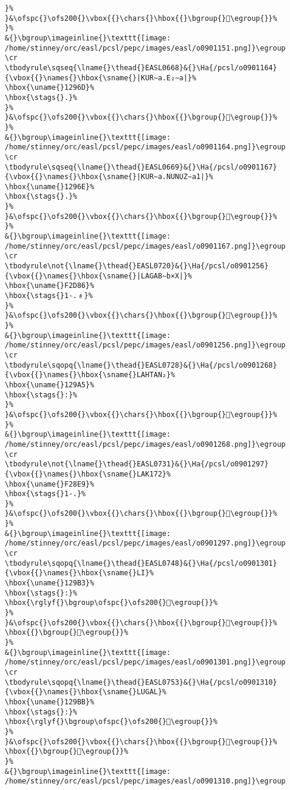 \begin{verbatim}
}%
}&\ofspc{}\ofs200{}\vbox{{}\chars{}\hbox{{}\bgroup{}𒥧\egroup{}}%
}%
&{}\bgroup\imageinline{}\texttt{[image: /home/stinney/orc/easl/pcsl/pepc/images/easl/o0901151.png]}\egroup
\cr
\tbodyrule\sqseq{\lname{}\thead{}EASL0668}&{}\Ha{/pcsl/o0901164}{\vbox{{}\names{}\hbox{\sname{}|KUR∼a.E₂∼a|}%
\hbox{\uname{}1296D}%
\hbox{\stags{}.}%
}%
}&\ofspc{}\ofs200{}\vbox{{}\chars{}\hbox{{}\bgroup{}𒥭\egroup{}}%
}%
&{}\bgroup\imageinline{}\texttt{[image: /home/stinney/orc/easl/pcsl/pepc/images/easl/o0901164.png]}\egroup
\cr
\tbodyrule\sqseq{\lname{}\thead{}EASL0669}&{}\Ha{/pcsl/o0901167}{\vbox{{}\names{}\hbox{\sname{}|KUR∼a.NUNUZ∼a1|}%
\hbox{\uname{}1296E}%
\hbox{\stags{}.}%
}%
}&\ofspc{}\ofs200{}\vbox{{}\chars{}\hbox{{}\bgroup{}𒥮\egroup{}}%
}%
&{}\bgroup\imageinline{}\texttt{[image: /home/stinney/orc/easl/pcsl/pepc/images/easl/o0901167.png]}\egroup
\cr
\tbodyrule\not{\lname{}\thead{}EASL0720}&{}\Ha{/pcsl/o0901256}{\vbox{{}\names{}\hbox{\sname{}|LAGAB∼b×X|}%
\hbox{\uname{}F2D86}%
\hbox{\stags{}1-.﹟}%
}%
}&\ofspc{}\ofs200{}\vbox{{}\chars{}\hbox{{}\bgroup{}󲶆\egroup{}}%
}%
&{}\bgroup\imageinline{}\texttt{[image: /home/stinney/orc/easl/pcsl/pepc/images/easl/o0901256.png]}\egroup
\cr
\tbodyrule\sqopq{\lname{}\thead{}EASL0728}&{}\Ha{/pcsl/o0901268}{\vbox{{}\names{}\hbox{\sname{}LAHTAN₂}%
\hbox{\uname{}129A5}%
\hbox{\stags{}:}%
}%
}&\ofspc{}\ofs200{}\vbox{{}\chars{}\hbox{{}\bgroup{}𒦥\egroup{}}%
}%
&{}\bgroup\imageinline{}\texttt{[image: /home/stinney/orc/easl/pcsl/pepc/images/easl/o0901268.png]}\egroup
\cr
\tbodyrule\not{\lname{}\thead{}EASL0731}&{}\Ha{/pcsl/o0901297}{\vbox{{}\names{}\hbox{\sname{}LAK172}%
\hbox{\uname{}F28E9}%
\hbox{\stags{}1-.}%
}%
}&\ofspc{}\ofs200{}\vbox{{}\chars{}\hbox{{}\bgroup{}󲣩\egroup{}}%
}%
&{}\bgroup\imageinline{}\texttt{[image: /home/stinney/orc/easl/pcsl/pepc/images/easl/o0901297.png]}\egroup
\cr
\tbodyrule\sqopq{\lname{}\thead{}EASL0748}&{}\Ha{/pcsl/o0901301}{\vbox{{}\names{}\hbox{\sname{}LI}%
\hbox{\uname{}129B3}%
\hbox{\stags{}:}%
\hbox{\rglyf{}\bgroup\ofspc{}\ofs200{}𒦳\egroup{}}%
}%
}&\ofspc{}\ofs200{}\vbox{{}\chars{}\hbox{{}\bgroup{}𒦳\egroup{}}%
\hbox{{}\bgroup{}𒦴\egroup{}}%
}%
&{}\bgroup\imageinline{}\texttt{[image: /home/stinney/orc/easl/pcsl/pepc/images/easl/o0901301.png]}\egroup
\cr
\tbodyrule\sqopq{\lname{}\thead{}EASL0753}&{}\Ha{/pcsl/o0901310}{\vbox{{}\names{}\hbox{\sname{}LUGAL}%
\hbox{\uname{}129BB}%
\hbox{\stags{}:}%
\hbox{\rglyf{}\bgroup\ofspc{}\ofs200{}𒦻\egroup{}}%
}%
}&\ofspc{}\ofs200{}\vbox{{}\chars{}\hbox{{}\bgroup{}𒦺\egroup{}}%
\hbox{{}\bgroup{}𒦻\egroup{}}%
}%
&{}\bgroup\imageinline{}\texttt{[image: /home/stinney/orc/easl/pcsl/pepc/images/easl/o0901310.png]}\egroup

\end{verbatim}
